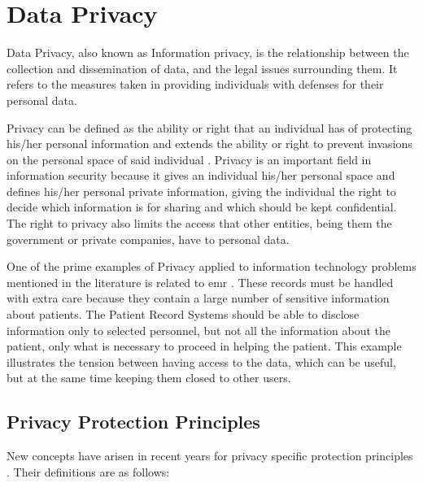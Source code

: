 \section{Data Privacy} 
\label{sec:DataPrivacy}


Data Privacy, also known as Information privacy, is the relationship between the collection and dissemination of data, and the legal issues surrounding them. It refers to the measures taken in providing individuals with defenses for their personal data.

Privacy can be defined as the ability or right that an individual has of protecting his/her personal information and extends the ability or right to prevent invasions on the personal space of said individual \cite{anderson2008security}.
Privacy is an important field in information security because it gives an individual his/her personal space and defines his/her personal private information, giving the individual the right to decide which information is for sharing and which should be kept confidential. The right to privacy also limits the access that other entities, being them the government or private companies, have to personal data.


One of the prime examples of Privacy applied to information technology problems mentioned in the literature is related to \ac{emr} \cite{Lu2014}. These records must be handled with extra care because they contain a large number of sensitive information about patients. The Patient Record Systems should be able to disclose information only to selected personnel, but not all the information about the patient, only what is necessary to proceed in helping the patient. This example illustrates the tension between having access to the data, which can be useful, but at the same time keeping them closed to other users.



\subsection{Privacy Protection Principles}
\label{ssec:PrivacyProtectionGoals}

New concepts have arisen in recent years for privacy specific protection principles \cite{Danezis2015}. Their definitions are as follows:

